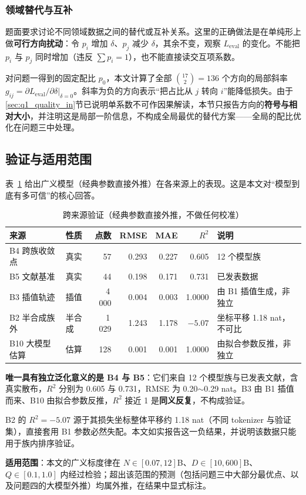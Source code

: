 \subsubsection{领域替代与互补}
\label{sec:q2_subst}

题面要求讨论不同领域数据之间的替代或互补关系。这里的正确做法是在单纯形上做\textbf{可行方向扰动}：令 $p_i$ 增加 $\delta$、$p_j$ 减少 $\delta$，其余不变，观察 $L_{\mathrm{eval}}$ 的变化。不能把 $p_i$ 与 $p_j$ 同时增加（违反 $\sum p_i=1$），也不能直接读交互项系数。

对问题一得到的固定配比 $p_0$，本文计算了全部 $\binom{17}{2}=136$ 个方向的局部斜率 $g_{ij}=\partial L_{\mathrm{eval}}/\partial\delta\big|_{\delta=0}$。斜率为负的方向表示``把占比从 $j$ 转向 $i$''能降低损失。由于\ref{sec:q1_quality_in}节已说明单系数不可作因果解读，本节只报告方向的\textbf{符号与相对大小}，并注明这是局部一阶信息，不构成全局最优的替代方案——全局的配比优化在问题三中处理。

\subsection{验证与适用范围}
\label{sec:q2_valid}

表~\ref{tab:q2_val} 给出广义模型（经典参数直接外推）在各来源上的表现。这是本文对``模型到底有多可信''的核心回答。

\begin{table}[htbp]
\centering
\caption{跨来源验证（经典参数直接外推，不做任何校准）}
\label{tab:q2_val}
\small
\begin{tabular}{l|l|r|r|r|r|l}
\toprule
\textbf{来源} & \textbf{性质} & \textbf{点数} & \textbf{RMSE} & \textbf{MAE} & \textbf{$R^2$} & \textbf{说明} \\
\midrule
B4 跨族收敛点 & 真实 & 57 & 0.293 & 0.227 & 0.605 & 12 个模型族 \\
B5 文献基准 & 真实 & 44 & 0.198 & 0.171 & 0.731 & 已发表数据 \\
B3 插值轨迹 & 插值 & 4\,000 & 0.004 & 0.003 & 1.0000 & 由 B1 插值生成，非独立 \\
B2 半合成族外 & 半合成 & 1\,029 & 1.243 & 1.178 & $-5.07$ & 坐标平移 1.18 nat，不可比 \\
B10 大模型估算 & 估算 & 128 & 0.001 & 0.001 & 1.0000 & 由拟合参数反推，非独立 \\
\bottomrule
\end{tabular}
\end{table}

\textbf{唯一具有独立泛化意义的是 B4 与 B5}：它们来自 12 个模型族与已发表文献，含真实散布，$R^2$ 分别为 0.605 与 0.731，RMSE 为 0.20$\sim$0.29 nat。B3 由 B1 插值而来、B10 由拟合参数反推，$R^2$ 接近 1 是\textbf{同义反复}，不构成验证。

B2 的 $R^2=-5.07$ 源于其损失坐标整体平移约 1.18 nat（不同 tokenizer 与验证集），直接套用 B1 参数必然失配。本文如实报告这一负结果，并说明该数据只能用于族内排序验证。

\textbf{适用范围}：本文的广义标度律在 $N\in[0.07,12]$B、$D\in[10,600]$B、$Q\in[0.1,1.0]$ 内经过检验；超出该范围的预测（包括问题三中大部分最优点、以及问题四的大模型外推）均属外推，在结果中显式标注。

